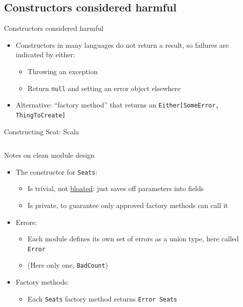 \subsection{Constructors considered harmful}

\begin{frame}{Constructors considered harmful}
  \begin{itemize}
  \item Constructors in many languages do not return a result, so failures
    are indicated by either:
    \begin{itemize}
    \item Throwing an exception
    \item Return \texttt{null} and setting an error object elsewhere
    \end{itemize}
  \item Alternative: ``factory method'' that returns an
    \texttt{Either[SomeError, ThingToCreate]}
  \end{itemize}
\end{frame}

\begin{frame}{Constructing Seat: Scala}
  \inputminted{scala}{Seats.scala}
\end{frame}

\begin{frame}{Notes on clean module design}
  \begin{itemize}
  \item The constructor for \texttt{Seats}:
    \begin{itemize}
    \item Is trivial, not
      \href{http://www.daedtech.com/beware-the-bloated-constructor}{bloated}:
      just saves off parameters into fields
    \item Is private, to guarantee only approved factory methods can call it
    \end{itemize}
  \item Errors:
    \begin{itemize}
    \item Each module defines its own set of errors as a union type,
      here called \texttt{Error}
    \item (Here only one, \texttt{BadCount})
    \end{itemize}
  \item Factory methods:
    \begin{itemize}
    \item Each \texttt{Seats} factory method returns \texttt{Error \/ Seats}
    \end{itemize}
  \end{itemize}
\end{frame}

